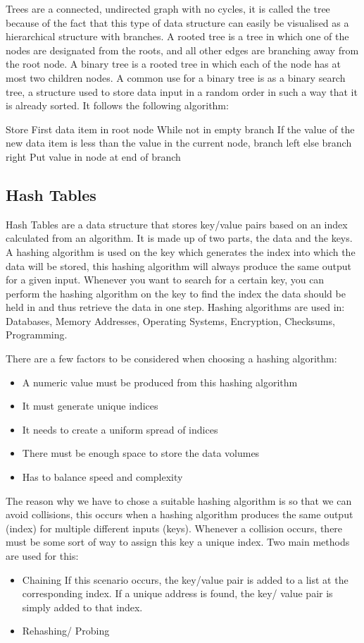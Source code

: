   Trees are a connected, undirected graph with no cycles, it is called the tree because of the fact that this type of data structure can easily be visualised as a hierarchical structure with branches. A rooted tree is a tree in which one of the nodes are designated from the roots, and all other edges are branching away from the root node. A binary tree is a rooted tree in which each of the node has at most two children nodes. A common use for a binary tree is as a binary search tree, a structure used to store data input in a random order in such a way that it is already sorted. It follows the following algorithm:
  
  Store First data item in root node
  While not in empty branch
	  If the value of the new data item is less than the value in the current node, branch left
	  else branch right
  Put value in node at end of branch
  
\subsection{Hash Tables}
  
  Hash Tables are a data structure that stores key/value pairs based on an index calculated from an algorithm. It is made up of two parts, the data and the keys. A hashing algorithm is used on the key which generates the index into which the data will be stored, this hashing algorithm will always produce the same output for a given input. Whenever you want to search for a certain key, you can perform the hashing algorithm on the key to find the index the data should be held in and thus retrieve the data in one step. Hashing algorithms are used in: Databases, Memory Addresses, Operating Systems, Encryption, Checksums, Programming.
  
  There are a few factors to be considered when choosing a hashing algorithm:
  \begin{itemize}
  	\item A numeric value must be produced from this hashing algorithm
  	\item It must generate unique indices
  	\item It needs to create a uniform spread of indices
  	\item There must be enough space to store the data volumes
  	\item Has to balance speed and complexity
  \end{itemize}
  
  The reason why we have to chose a suitable hashing algorithm is so that we can avoid collisions, this occurs when a hashing algorithm produces the same output (index) for multiple different inputs (keys). Whenever a collision occurs, there must be some sort of way to assign this key a unique index. Two main methods are used for this:
  \begin{itemize}
  	\item Chaining
	  	\subitem If this scenario occurs, the key/value pair is added to a list at the corresponding index. If a unique address is found, the key/ value pair is simply added to that index.
  	\item Rehashing/ Probing
  \end{itemize}
